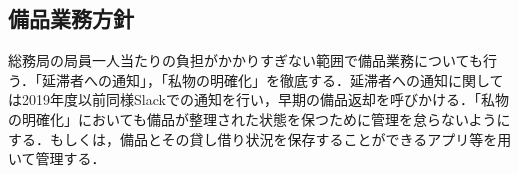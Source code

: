 \subsection*{備品業務方針}

総務局の局員一人当たりの負担がかかりすぎない範囲で備品業務についても行う．「延滞者への通知」，「私物の明確化」を徹底する．延滞者への通知に関しては2019年度以前同様Slackでの通知を行い，早期の備品返却を呼びかける．「私物の明確化」においても備品が整理された状態を保つために管理を怠らないようにする．もしくは，備品とその貸し借り状況を保存することができるアプリ等を用いて管理する．

